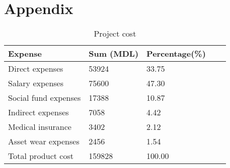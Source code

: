 \section*{Appendix}

\begin{table}[ht!]
\renewcommand\thetable{A.1}
\centering
\caption{Project cost}
{
\renewcommand{\arraystretch}{1.25}
\begin{tabular}{ lllll }
\hline
  Expense &  Sum (MDL) & Percentage(\%) \\ \hline
  Direct expenses & 53924 & 33.75 \\
  Salary expenses & 75600 & 47.30 \\
  Social fund expenses & 17388 & 10.87 \\
  Indirect expenses & 7058 & 4.42 \\
  Medical insurance & 3402 & 2.12 \\
  Asset wear expenses & 2456 & 1.54 \\ \hline
  Total product cost & 159828 & 100.00 \\
\end{tabular}
}
\label{project_cost}
\end{table}


\clearpage